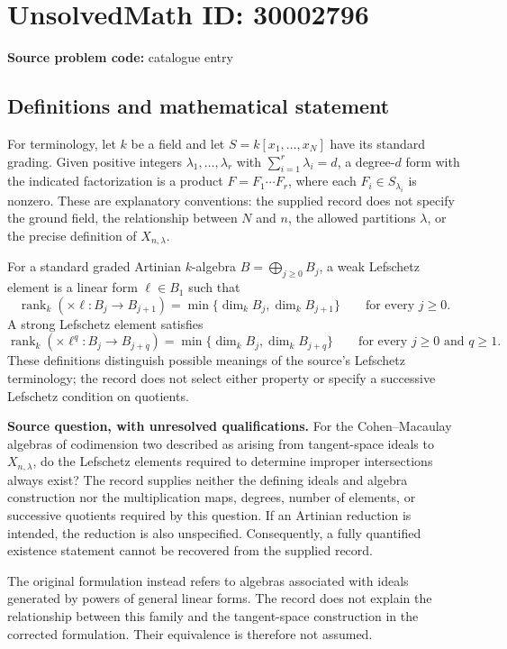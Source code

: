 \documentclass[11pt]{article}
\begin{document}
\section*{UnsolvedMath ID: 30002796}
\textbf{Source problem code:} catalogue entry
\subsection{Definitions and mathematical statement}
For terminology, let \(k\) be a field and let \(S=k[x_1,\ldots,x_N]\) have its standard grading. Given positive integers \(\lambda_1,\ldots,\lambda_r\) with \(\sum_{i=1}^r\lambda_i=d\), a degree-\(d\) form with the indicated factorization is a product \(F=F_1\cdots F_r\), where each \(F_i\in S_{\lambda_i}\) is nonzero. These are explanatory conventions: the supplied record does not specify the ground field, the relationship between \(N\) and \(n\), the allowed partitions \(\lambda\), or the precise definition of \(X_{n,\lambda}\).

For a standard graded Artinian \(k\)-algebra \(B=\bigoplus_{j\geq 0}B_j\), a weak Lefschetz element is a linear form \(\ell\in B_1\) such that
\[
\operatorname{rank}_k(\times\ell:B_j\longrightarrow B_{j+1})
=\min\{\dim_k B_j,\dim_k B_{j+1}\}
\qquad\text{for every }j\geq 0.
\]
A strong Lefschetz element satisfies
\[
\operatorname{rank}_k(\times\ell^q:B_j\longrightarrow B_{j+q})
=\min\{\dim_k B_j,\dim_k B_{j+q}\}
\qquad\text{for every }j\geq 0\text{ and }q\geq 1.
\]
These definitions distinguish possible meanings of the source's Lefschetz terminology; the record does not select either property or specify a successive Lefschetz condition on quotients.

\textbf{Source question, with unresolved qualifications.} For the Cohen--Macaulay algebras of codimension two described as arising from tangent-space ideals to \(X_{n,\lambda}\), do the Lefschetz elements required to determine improper intersections always exist? The record supplies neither the defining ideals and algebra construction nor the multiplication maps, degrees, number of elements, or successive quotients required by this question. If an Artinian reduction is intended, the reduction is also unspecified. Consequently, a fully quantified existence statement cannot be recovered from the supplied record.

The original formulation instead refers to algebras associated with ideals generated by powers of general linear forms. The record does not explain the relationship between this family and the tangent-space construction in the corrected formulation. Their equivalence is therefore not assumed.
\end{document}
